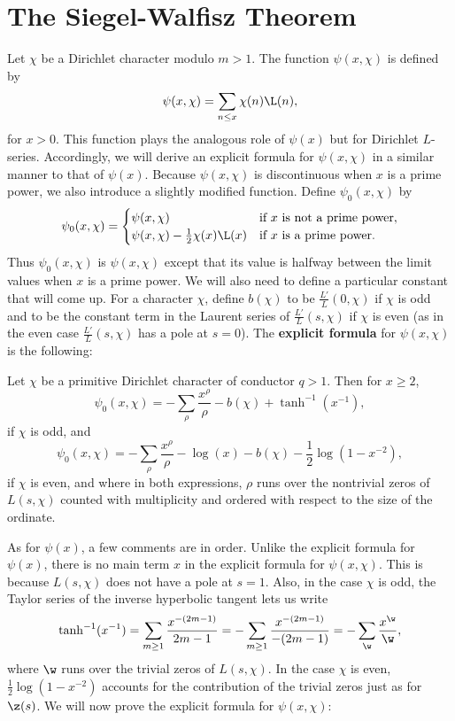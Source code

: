   \section{The Siegel-Walfisz Theorem}
    Let \(\chi\) be a Dirichlet character modulo \(m > 1\). The function \(\psi(x,\chi)\) is defined by
    \[
      \psi(x,\chi) = \sum_{n \le x}\chi(n)\L(n),
    \]
    for \(x > 0\). This function plays the analogous role of \(\psi(x)\) but for Dirichlet \(L\)-series. Accordingly, we will derive an explicit formula for \(\psi(x,\chi)\) in a similar manner to that of \(\psi(x)\). Because \(\psi(x,\chi)\) is discontinuous when \(x\) is a prime power, we also introduce a slightly modified function. Define \(\psi_{0}(x,\chi)\) by
    \[
      \psi_{0}(x,\chi) = \begin{cases} \psi(x,\chi) & \text{if \(x\) is not a prime power}, \\ \psi(x,\chi)-\frac{1}{2}\chi(x)\L(x) & \text{if \(x\) is a prime power}. \end{cases}
    \]
    Thus \(\psi_{0}(x,\chi)\) is \(\psi(x,\chi)\) except that its value is halfway between the limit values when \(x\) is a prime power. We will also need to define a particular constant that will come up. For a character \(\chi\), define \(b(\chi)\) to be \(\frac{L'}{L}(0,\chi)\) if \(\chi\) is odd and to be the constant term in the Laurent series of \(\frac{L'}{L}(s,\chi)\) if \(\chi\) is even (as in the even case \(\frac{L'}{L}(s,\chi)\) has a pole at \(s = 0\)). The \textbf{explicit formula} for \(\psi(x,\chi)\) is the following:

    \begin{theorem*}
      Let \(\chi\) be a primitive Dirichlet character of conductor \(q > 1\). Then for \(x \ge 2\),
      \[
        \psi_{0}(x,\chi) = -\sum_{\rho}\frac{x^{\rho}}{\rho}-b(\chi)+\tanh^{-1}(x^{-1}),
      \]
      if \(\chi\) is odd, and
      \[
        \psi_{0}(x,\chi) = -\sum_{\rho}\frac{x^{\rho}}{\rho}-\log(x)-b(\chi)-\frac{1}{2}\log(1-x^{-2}),
      \]
      if \(\chi\) is even, and where in both expressions, \(\rho\) runs over the nontrivial zeros of \(L(s,\chi)\) counted with multiplicity and ordered with respect to the size of the ordinate.
    \end{theorem*}

    As for \(\psi(x)\), a few comments are in order. Unlike the explicit formula for \(\psi(x)\), there is no main term \(x\) in the explicit formula for \(\psi(x,\chi)\). This is because \(L(s,\chi)\) does not have a pole at \(s = 1\). Also, in the case \(\chi\) is odd, the Taylor series of the inverse hyperbolic tangent lets us write
    \[
      \tanh^{-1}(x^{-1}) = \sum_{m \ge 1}\frac{x^{-(2m-1)}}{2m-1} = -\sum_{m \ge 1}\frac{x^{-(2m-1)}}{-(2m-1)} = -\sum_{\w}\frac{x^{\w}}{\w},
    \]
    where \(\w\) runs over the trivial zeros of \(L(s,\chi)\). In the case \(\chi\) is even, \(\frac{1}{2}\log(1-x^{-2})\) accounts for the contribution of the trivial zeros just as for \(\z(s)\). We will now prove the explicit formula for \(\psi(x,\chi)\):

